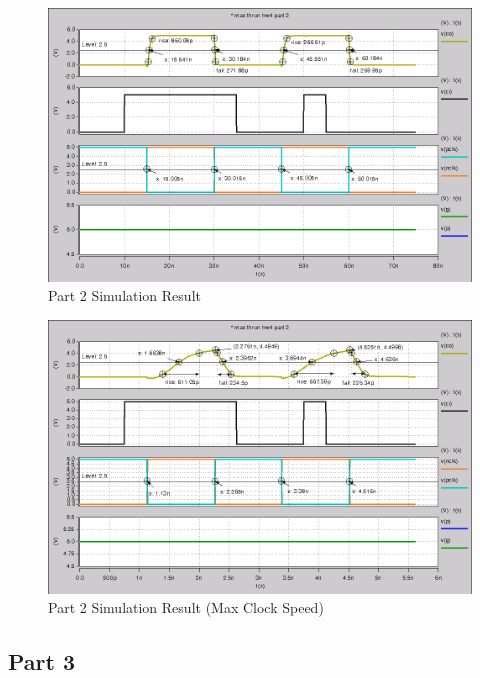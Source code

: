 \documentclass{article}
\begin{document}
\begin{figure}[H]
    \centering
    \includegraphics[width=\linewidth]{../part_2.png}
    \caption{Part 2 Simulation Result}
\end{figure}

\begin{figure}[H]
    \centering
    \includegraphics[width=\linewidth]{../part_2_fast.png}
    \caption{Part 2 Simulation Result (Max Clock Speed)}
\end{figure}

\newpage
\subsection*{Part 3}


\end{document}
